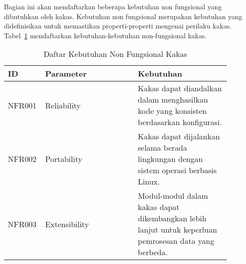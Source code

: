 
Bagian ini akan mendaftarkan beberapa kebutuhan non fungsional yang dibutuhkan oleh kakas.
Kebutuhan non fungsional merupakan kebutuhan yang didefinisikan untuk memastikan properti-properti mengenai perilaku kakas.
Tabel~\ref{table:non-functional-req} mendaftarkan kebutuhan-kebutuhan non-fungsional kakas.

\begin{table}[ht]
    \caption{Daftar Kebutuhan Non Fungsional Kakas}\label{table:non-functional-req}
    \scriptsize
    \centering
    \begin{tabular}{|p{0.1\linewidth} | p{0.4\linewidth} | p{0.4\linewidth}|} 
        \hline
        \textbf{ID} & \textbf{Parameter} & \textbf{Kebutuhan}\\ [0.5ex] 
        \hline
        NFR001 & Reliability & Kakas dapat diandalkan dalam menghasilkan kode yang konsisten berdasarkan konfigurasi.  \\ 
        \hline
        NFR002 & Portability & Kakas dapat dijalankan selama berada lingkungan dengan sistem operasi berbasis Linux.  \\ 
        \hline
        NFR003 & Extensibility & Modul-modul dalam kakas dapat dikembangkan lebih lanjut untuk keperluan pemrosesan data yang berbeda.  \\ 
        \hline
    \end{tabular}
\end{table}
